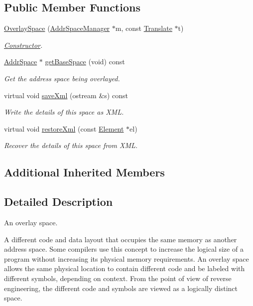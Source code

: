\subsection*{Public Member Functions}
\begin{DoxyCompactItemize}
\item 
\mbox{\hyperlink{class_overlay_space_a4ff9ec9fa7ed004c685f6f34c9978c09}{Overlay\+Space}} (\mbox{\hyperlink{class_addr_space_manager}{Addr\+Space\+Manager}} $\ast$m, const \mbox{\hyperlink{class_translate}{Translate}} $\ast$t)
\begin{DoxyCompactList}\small\item\em \mbox{\hyperlink{class_constructor}{Constructor}}. \end{DoxyCompactList}\item 
\mbox{\hyperlink{class_addr_space}{Addr\+Space}} $\ast$ \mbox{\hyperlink{class_overlay_space_a3a9afed136f872a975743f173f896689}{get\+Base\+Space}} (void) const
\begin{DoxyCompactList}\small\item\em Get the address space being overlayed. \end{DoxyCompactList}\item 
virtual void \mbox{\hyperlink{class_overlay_space_a60c25f7c85366b0d7dd0fdf2755180b2}{save\+Xml}} (ostream \&s) const
\begin{DoxyCompactList}\small\item\em Write the details of this space as X\+ML. \end{DoxyCompactList}\item 
virtual void \mbox{\hyperlink{class_overlay_space_ac954d7e1ddb57d0f811b4200bd0deee2}{restore\+Xml}} (const \mbox{\hyperlink{class_element}{Element}} $\ast$el)
\begin{DoxyCompactList}\small\item\em Recover the details of this space from X\+ML. \end{DoxyCompactList}\end{DoxyCompactItemize}
\subsection*{Additional Inherited Members}


\subsection{Detailed Description}
An overlay space. 

A different code and data layout that occupies the same memory as another address space. Some compilers use this concept to increase the logical size of a program without increasing its physical memory requirements. An overlay space allows the same physical location to contain different code and be labeled with different symbols, depending on context. From the point of view of reverse engineering, the different code and symbols are viewed as a logically distinct space. 

